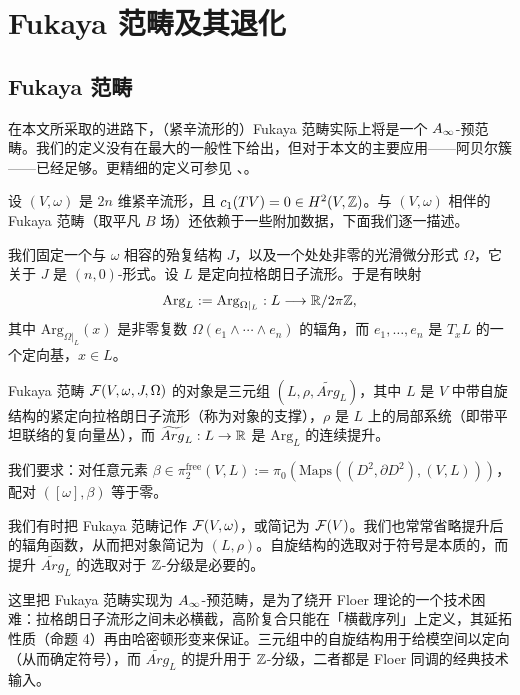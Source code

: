 \section{Fukaya 范畴及其退化}

\subsection{Fukaya 范畴}

在本文所采取的进路下，（紧辛流形的）Fukaya 范畴实际上将是一个 $A_{\infty}$-预范畴。我们的定义没有在最大的一般性下给出，但对于本文的主要应用——阿贝尔簇——已经足够。更精细的定义可参见 \cite{Fu1}、\cite{FuOOO}。

设 $(V,\omega)$ 是 $2n$ 维紧辛流形，且 $c_1(TV)=0\in H^2(V,\mathbb{Z})$。与 $(V,\omega)$ 相伴的 Fukaya 范畴（取平凡 $B$ 场）还依赖于一些附加数据，下面我们逐一描述。

我们固定一个与 $\omega$ 相容的殆复结构 $J$，以及一个处处非零的光滑微分形式 $\Omega$，它关于 $J$ 是 $(n,0)$-形式。设 $L$ 是定向拉格朗日子流形。于是有映射
\[
  \mathrm{Arg}_L:=\mathrm{Arg}_{\Omega|_L}:L\longrightarrow \mathbb{R}/2\pi\mathbb{Z},
\]
其中 $\mathrm{Arg}_{\Omega|_L}(x)$ 是非零复数 $\Omega(e_1\wedge\cdots\wedge e_n)$ 的辐角，而 $e_1,\dots,e_n$ 是 $T_xL$ 的一个定向基，$x\in L$。

\begin{dfn}
Fukaya 范畴 $\mathcal{F}(V,\omega,J,\Omega)$ 的对象是三元组 $(L,\rho,\widetilde{Arg}_L)$，其中 $L$ 是 $V$ 中带自旋结构的紧定向拉格朗日子流形（称为对象的支撑），$\rho$ 是 $L$ 上的局部系统（即带平坦联络的复向量丛），而 $\widetilde{Arg}_L:L\to\mathbb{R}$ 是 $\mathrm{Arg}_L$ 的连续提升。

我们要求：对任意元素 $\beta\in\pi_2^{\mathrm{free}}(V,L):=\pi_0(\mathrm{Maps}((D^2,\partial D^2),(V,L)))$，配对 $([\omega],\beta)$ 等于零。
\end{dfn}

我们有时把 Fukaya 范畴记作 $\mathcal{F}(V,\omega)$，或简记为 $\mathcal{F}(V)$。我们也常常省略提升后的辐角函数，从而把对象简记为 $(L,\rho)$。自旋结构的选取对于符号是本质的，而提升 $\widetilde{Arg}_L$ 的选取对于 $\mathbb{Z}$-分级是必要的。

\begin{yizhu}
这里把 Fukaya 范畴实现为 $A_{\infty}$-预范畴，是为了绕开 Floer 理论的一个技术困难：拉格朗日子流形之间未必横截，高阶复合只能在「横截序列」上定义，其延拓性质（命题 4）再由哈密顿形变来保证。三元组中的自旋结构用于给模空间以定向（从而确定符号），而 $\widetilde{Arg}_L$ 的提升用于 $\mathbb{Z}$-分级，二者都是 Floer 同调的经典技术输入。
\end{yizhu}

